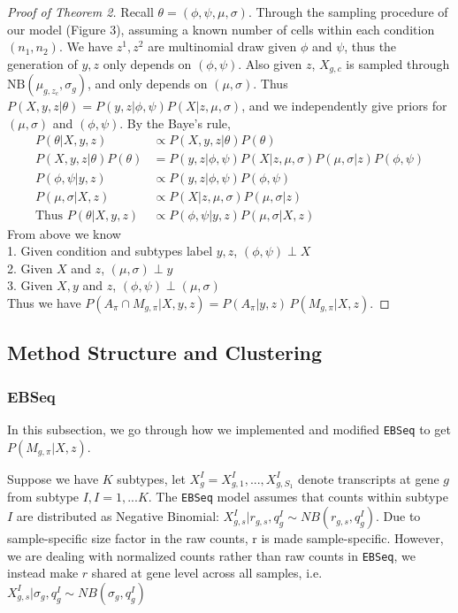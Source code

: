 \documentclass[aoas,preprint]{imsart}
\begin{document}
\begin{proof}[Proof of Theorem 2]
Recall $\theta = (\phi, \psi, \mu, \sigma)$.
Through the sampling procedure of our model (Figure 3), assuming a known number of cells within each condition $(n_1,n_2)$. We have $z^1, z^2$ are multinomial draw given $\phi$ and $\psi$, 
thus the generation of $y, z$ only depends on $(\phi,\psi)$.
Also given $z$, $X_{g,c}$ is sampled through $\text{NB}(\mu_{g,z_c}, \sigma_g)$, and only depends on $(\mu, \sigma)$.
Thus $P(X,y,z | \theta) = P(y, z | \phi,\psi ) P(X | z, \mu, \sigma)$, and we independently give priors for $(\mu,\sigma)$ and $(\phi, \psi)$.
By the Baye's rule, 
\begin{align*}
P(\theta | X,y,z) &\propto P(X,y,z | \theta) P(\theta) \\
P(X,y,z | \theta) P(\theta)  &=  P(y, z | \phi,\psi ) P(X | z, \mu, \sigma) P(\mu,\sigma | z) P(\phi, \psi)\\
P(\phi,\psi | y, z) &\propto P(y, z | \phi,\psi )P(\phi, \psi)\\
P(\mu, \sigma | X, z) &\propto P(X | z, \mu, \sigma) P(\mu,\sigma | z)\\
\text{Thus }
P(\theta | X,y,z) &\propto P(\phi,\psi | y, z) P(\mu, \sigma | X, z)
\end{align*}
From above we know\\
1. Given condition and subtypes label $y,z$, $(\phi,\psi) \perp X$\\
2. Given $X$ and $z$, $(\mu, \sigma) \perp y$\\
3. Given $X,y$ and $z$, $(\phi, \psi) \perp (\mu, \sigma)$\\ 
Thus we have $  P\left(A_\pi \cap M_{g,\pi} |X,y,z \right) 
 =  P\left(A_\pi |y,z \right) \, 
                      P\left(M_{g,\pi}| X,z \right).  $
\end{proof}


\subsection{Method Structure and Clustering}

\subsubsection{EBSeq}
In this subsection, we go through how we implemented and modified \texttt{EBSeq} to get $P(M_{g,\pi} | X, z)$.

Suppose we have $K$ subtypes, let $X_g^I = X_{g, 1}^I, ... , X_{g, S_1}^I$ denote transcripts at gene $g$ from subtype $I, I = 1, ... K$.  The \texttt{EBSeq} model assumes that counts within subtype $I$ are distributed as Negative Binomial:
$X_{g, s}^I | r_{g,s}, q_g^I \sim NB(r_{g,s}, q_g^I)$. Due to sample-specific size factor in the raw counts, r is made sample-specific. However, we are dealing with normalized counts rather than raw counts in \texttt{EBSeq}, we instead make $r$ shared at gene level across all samples, i.e. 
$X_{g, s}^I | \sigma_g, q_g^I \sim NB(\sigma_g, q_g^I)$
\end{document}
